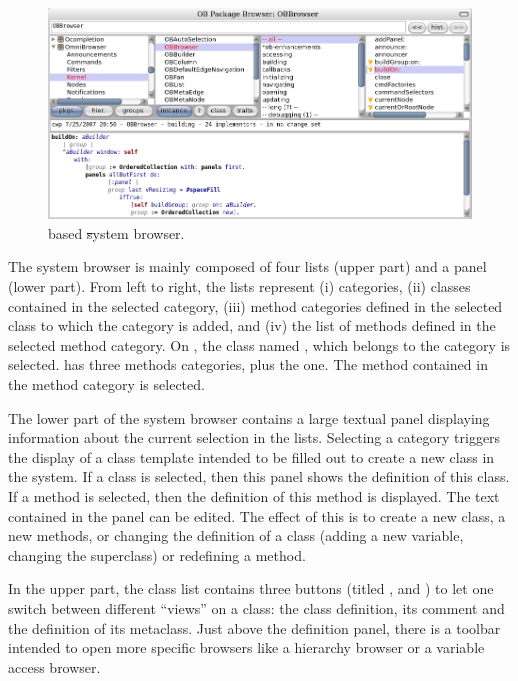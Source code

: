 \documentclass[a4paper,10pt,twoside]{book}
\begin{document}
\begin{figure}[!ht]
\begin{center}
\includegraphics[width=\textwidth]{obbrowser}
\caption{\ob based \st system browser.} 
\end{center}
\end{figure}

The system browser is mainly composed of four lists (upper part) and a panel (lower part). From left to right, the lists represent (i) categories, (ii) classes contained in the selected category, (iii) method categories defined in the selected class to which the  category is added, and (iv) the list of methods defined in the selected method category. On , the class named , which belongs to the category  is selected.  has three methods categories, plus the  one. The method  contained in the  method category is selected.

The lower part of the system browser contains a large textual panel displaying information about the current selection in the lists. Selecting a category triggers the display of a class template intended to be filled out to create a new class in the system. If a class is selected, then this panel shows the definition of this class. If a method is selected, then the definition of this method is displayed. The text contained in the panel can be edited. The effect of this is to create a new class, a new methods, or changing the definition of a class (\eg adding a new variable, changing the superclass) or redefining a method.

In the upper part, the class list contains three buttons (titled ,  and ) to let one switch between different ``views'' on a class: the class definition, its comment and the definition of its metaclass. Just above the definition panel, there is a toolbar intended to open more specific browsers like a hierarchy browser or a variable access browser.
\end{document}
